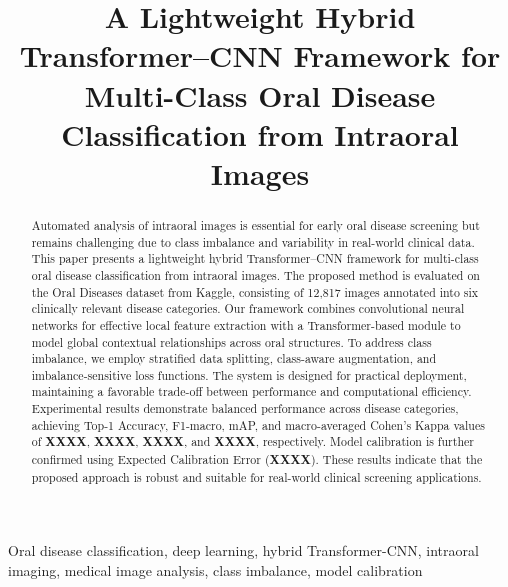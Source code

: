 \documentclass[journal]{IEEEtran}
\begin{document}
\title{A Lightweight Hybrid Transformer--CNN Framework for Multi-Class Oral Disease Classification from Intraoral Images}

\author{
}

\maketitle

\begin{abstract}
Automated analysis of intraoral images is essential for early oral disease screening but remains challenging due to class imbalance and variability in real-world clinical data. This paper presents a lightweight hybrid Transformer--CNN framework for multi-class oral disease classification from intraoral images. The proposed method is evaluated on the Oral Diseases dataset from Kaggle, consisting of 12{,}817 images annotated into six clinically relevant disease categories.
Our framework combines convolutional neural networks for effective local feature extraction with a Transformer-based module to model global contextual relationships across oral structures. To address class imbalance, we employ stratified data splitting, class-aware augmentation, and imbalance-sensitive loss functions. The system is designed for practical deployment, maintaining a favorable trade-off between performance and computational efficiency.
Experimental results demonstrate balanced performance across disease categories, achieving Top-1 Accuracy, F1-macro, mAP, and macro-averaged Cohen's Kappa values of \textbf{XXXX}, \textbf{XXXX}, \textbf{XXXX}, and \textbf{XXXX}, respectively. Model calibration is further confirmed using Expected Calibration Error (\textbf{XXXX}). These results indicate that the proposed approach is robust and suitable for real-world clinical screening applications.
\end{abstract}

\begin{IEEEkeywords}
Oral disease classification, deep learning, hybrid Transformer-CNN, intraoral imaging, medical image analysis, class imbalance, model calibration
\end{IEEEkeywords}
















\end{document}
